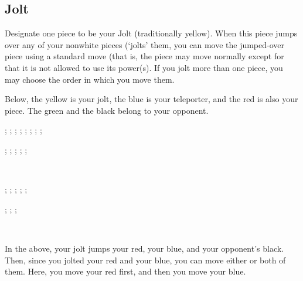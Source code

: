 \documentclass[../rulebook.tex]{subfiles}
\begin{document}
\subsection*{Jolt}

Designate one piece to be your Jolt (traditionally yellow).
When this piece jumps over any of your nonwhite pieces (`jolts' them,
you can move the jumped-over piece using a standard move
(that is, the piece may move normally except for that it is not
allowed to use its power(s). If you jolt more than one piece,
you may choose the order in which you move them.

Below, the yellow is your jolt, the blue is your teleporter,
and the red is also your piece.
The green and the black belong to your opponent.

\begin{center}
  \begin{struggleboard}
    ;
    ;
    ;
    ;
    ;
    ;
    ;
    ;
  \end{struggleboard}
  \begin{struggleboard}
    ;
    ;
    ;
    ;
    ;
  \end{struggleboard}
\end{center}
\
\begin{center}
  \begin{struggleboard}
    ;
    ;
    ;
    ;
    ;
  \end{struggleboard}
  \begin{struggleboard}
    ;
    ;
    ;
  \end{struggleboard}
\end{center}

\

In the above, your jolt jumps your red, your blue,
and your opponent's black. Then, since you jolted your
red and your blue, you can move either or both of them.
Here, you move your red first, and then you move your blue.
\end{document}
